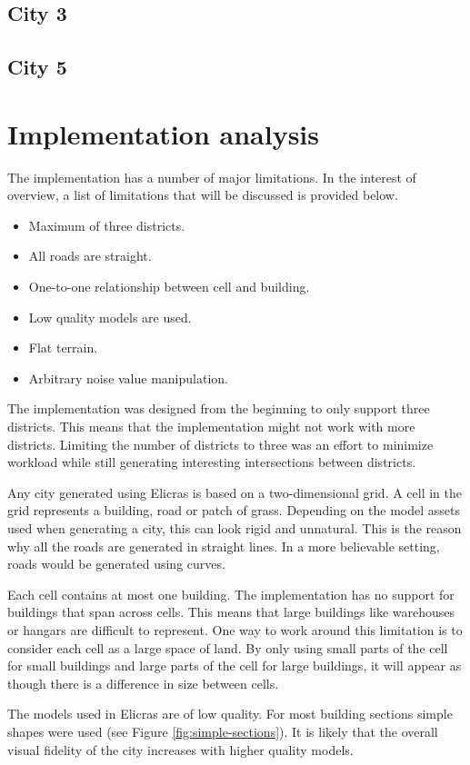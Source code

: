 	\subsection{City 3}
	\subsection{City 5}
	
\section{Implementation analysis}
The implementation has a number of major limitations. In the interest of overview, a list of limitations that will be discussed is provided below.
	
\begin{itemize}
	\setlength\itemsep{0.01cm}
	\item Maximum of three districts.
	\item All roads are straight.
	\item One-to-one relationship between cell and building.
	\item Low quality models are used.
	\item Flat terrain.
	\item Arbitrary noise value manipulation.
\end{itemize}
	
The implementation was designed from the beginning to only support three districts. This means that the implementation might not work with more districts. Limiting the number of districts to three was an effort to minimize workload while still generating interesting intersections between districts.
\par
Any city generated using Elicras is based on a two-dimensional grid. A cell in the grid represents a building, road or patch of grass. Depending on the model assets used when generating a city, this can look rigid and unnatural. This is the reason why all the roads are generated in straight lines. In a more believable setting, roads would be generated using curves\cite{CurvedRoads}.
\par
Each cell contains at most one building. The implementation has no support for buildings that span across cells. This means that large buildings like warehouses or hangars are difficult to represent. One way to work around this limitation is to consider each cell as a large space of land. By only using small parts of the cell for small buildings and large parts of the cell for large buildings, it will appear as though there is a difference in size between cells.
\par
The models used in Elicras are of low quality. For most building sections simple shapes were used (see Figure \ref{fig:simple-sections}). It is likely that the overall visual fidelity of the city increases with higher quality models.


